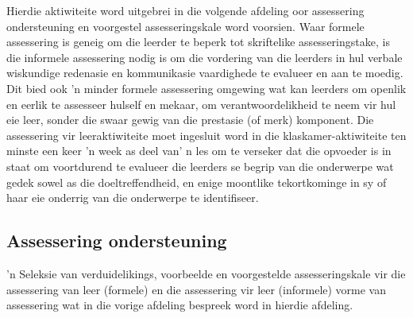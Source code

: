 Hierdie aktiwiteite word uitgebrei in die volgende afdeling oor assessering ondersteuning en voorgestel assesseringskale word voorsien. Waar formele assessering is geneig om die leerder te beperk tot skriftelike assesseringstake, is die informele assessering nodig is om die vordering van die leerders in hul verbale wiskundige redenasie en kommunikasie vaardighede te evalueer en aan te moedig. Dit bied ook 'n minder formele assessering omgewing wat kan leerders om openlik en eerlik te assesseer hulself en mekaar, om verantwoordelikheid te neem vir hul eie leer, sonder die swaar gewig van die prestasie (of merk) komponent. Die assessering vir leeraktiwiteite moet ingesluit word in die klaskamer-aktiwiteite ten minste een keer 'n week as deel van' n les om te verseker dat die opvoeder is in staat om voortdurend te evalueer die leerders se begrip van die onderwerpe wat gedek sowel as die doeltreffendheid, en enige moontlike tekortkominge in sy of haar eie onderrig van die onderwerpe te identifiseer.

\subsection{Assessering ondersteuning}
'n Seleksie van verduidelikings, voorbeelde en voorgestelde assesseringskale vir die assessering van leer (formele) en die assessering vir leer (informele) vorme van assessering wat in die vorige afdeling bespreek word in hierdie afdeling.

